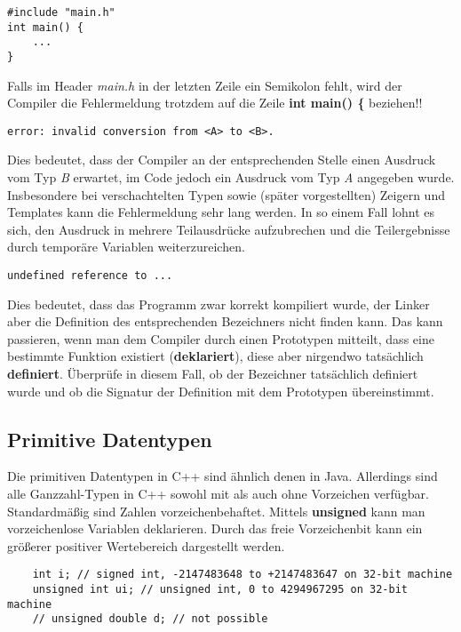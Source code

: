 \begin{lstlisting}
#include "main.h"
int main() {
	...
}
\end{lstlisting}

Falls im Header \emph{main.h} in der letzten Zeile ein Semikolon fehlt, wird der Compiler die Fehlermeldung trotzdem auf die Zeile \textbf{int main() \{} beziehen!!

\begin{verbatim}
error: invalid conversion from <A> to <B>.
\end{verbatim}

Dies bedeutet, dass der Compiler an der entsprechenden Stelle einen Ausdruck vom Typ \emph{B} erwartet, im Code jedoch ein Ausdruck vom Typ \emph{A} angegeben wurde. Insbesondere bei verschachtelten Typen sowie (später vorgestellten) Zeigern und Templates kann die Fehlermeldung sehr lang werden. In so einem Fall lohnt es sich, den Ausdruck in mehrere Teilausdrücke aufzubrechen und die Teilergebnisse durch temporäre Variablen weiterzureichen.

\begin{verbatim}
undefined reference to ...
\end{verbatim}

Dies bedeutet, dass das Programm zwar korrekt kompiliert wurde, der Linker aber die Definition des entsprechenden Bezeichners nicht finden kann.
Das kann passieren, wenn man dem Compiler durch einen Prototypen mitteilt, dass eine bestimmte Funktion existiert (\textbf{deklariert}), diese aber nirgendwo tatsächlich \textbf{definiert}.
Überprüfe in diesem Fall, ob der Bezeichner tatsächlich definiert wurde und ob die Signatur der Definition mit dem Prototypen übereinstimmt.


\subsection{Primitive Datentypen}
Die primitiven Datentypen in C++ sind ähnlich denen in Java.
Allerdings sind alle Ganzzahl-Typen in C++ sowohl mit als auch ohne Vorzeichen verfügbar.
Standardmäßig sind Zahlen vorzeichenbehaftet.
Mittels \textbf{unsigned} kann man vorzeichenlose Variablen deklarieren.
Durch das freie Vorzeichenbit kann ein größerer positiver Wertebereich dargestellt werden.

\begin{lstlisting}
 	int i; // signed int, -2147483648 to +2147483647 on 32-bit machine
	unsigned int ui; // unsigned int, 0 to 4294967295 on 32-bit machine
	// unsigned double d; // not possible
\end{lstlisting}

